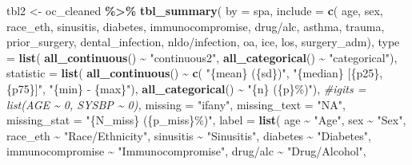 \documentclass[
]{article}
\newenvironment{Shaded}{\begin{snugshade}}{\end{snugshade}}
\newcommand{\AttributeTok}[1]{\textcolor[rgb]{0.13,0.29,0.53}{#1}}
\newcommand{\CommentTok}[1]{\textcolor[rgb]{0.56,0.35,0.01}{\textit{#1}}}
\newcommand{\FunctionTok}[1]{\textcolor[rgb]{0.13,0.29,0.53}{\textbf{#1}}}
\newcommand{\NormalTok}[1]{#1}
\newcommand{\OtherTok}[1]{\textcolor[rgb]{0.56,0.35,0.01}{#1}}
\newcommand{\SpecialCharTok}[1]{\textcolor[rgb]{0.81,0.36,0.00}{\textbf{#1}}}
\newcommand{\StringTok}[1]{\textcolor[rgb]{0.31,0.60,0.02}{#1}}
\begin{document}
\begin{Shaded}
\begin{Highlighting}[]
\NormalTok{tbl2 }\OtherTok{\textless{}{-}}\NormalTok{ oc\_cleaned }\SpecialCharTok{\%\textgreater{}\%}
  \FunctionTok{tbl\_summary}\NormalTok{(}
    \AttributeTok{by =}\NormalTok{ spa,}
    \AttributeTok{include =} \FunctionTok{c}\NormalTok{(}
\NormalTok{      age, sex, race\_eth, sinusitis, diabetes, immunocompromise, }\StringTok{\textasciigrave{}}\AttributeTok{drug/alc}\StringTok{\textasciigrave{}}\NormalTok{,}
\NormalTok{      asthma, trauma, prior\_surgery, dental\_infection, }\StringTok{\textasciigrave{}}\AttributeTok{nldo/infection}\StringTok{\textasciigrave{}}\NormalTok{, }
\NormalTok{      oa, ice, los, surgery\_adm),}
    \AttributeTok{type =} \FunctionTok{list}\NormalTok{(}
      \FunctionTok{all\_continuous}\NormalTok{() }\SpecialCharTok{\textasciitilde{}} \StringTok{"continuous2"}\NormalTok{,}
      \FunctionTok{all\_categorical}\NormalTok{() }\SpecialCharTok{\textasciitilde{}} \StringTok{"categorical"}\NormalTok{),}
    \AttributeTok{statistic =} \FunctionTok{list}\NormalTok{(}
      \FunctionTok{all\_continuous}\NormalTok{() }\SpecialCharTok{\textasciitilde{}} \FunctionTok{c}\NormalTok{(}
        \StringTok{"\{mean\} (\{sd\})"}\NormalTok{,}
        \StringTok{"\{median\} [\{p25\}, \{p75\}]"}\NormalTok{,}
        \StringTok{"\{min\} {-} \{max\}"}\NormalTok{),}
      \FunctionTok{all\_categorical}\NormalTok{() }\SpecialCharTok{\textasciitilde{}} \StringTok{"\{n\} (\{p\}\%)"}\NormalTok{),}
    \CommentTok{\#igits = list(AGE \textasciitilde{} 0, SYSBP \textasciitilde{} 0),}
    \AttributeTok{missing =} \StringTok{"ifany"}\NormalTok{,}
    \AttributeTok{missing\_text =} \StringTok{"NA"}\NormalTok{,}
    \AttributeTok{missing\_stat =} \StringTok{"\{N\_miss\} (\{p\_miss\}\%)"}\NormalTok{,}
    \AttributeTok{label =} \FunctionTok{list}\NormalTok{(}
\NormalTok{      age }\SpecialCharTok{\textasciitilde{}} \StringTok{"Age"}\NormalTok{,}
\NormalTok{      sex }\SpecialCharTok{\textasciitilde{}} \StringTok{"Sex"}\NormalTok{,}
\NormalTok{      race\_eth }\SpecialCharTok{\textasciitilde{}} \StringTok{"Race/Ethnicity"}\NormalTok{,}
\NormalTok{      sinusitis }\SpecialCharTok{\textasciitilde{}} \StringTok{"Sinusitis"}\NormalTok{,}
\NormalTok{      diabetes }\SpecialCharTok{\textasciitilde{}} \StringTok{"Diabetes"}\NormalTok{,}
\NormalTok{      immunocompromise }\SpecialCharTok{\textasciitilde{}} \StringTok{"Immunocompromise"}\NormalTok{,}
      \StringTok{\textasciigrave{}}\AttributeTok{drug/alc}\StringTok{\textasciigrave{}} \SpecialCharTok{\textasciitilde{}} \StringTok{"Drug/Alcohol"}\NormalTok{,}

\end{Highlighting}
\end{Shaded}
\end{document}

